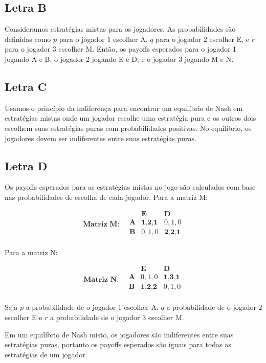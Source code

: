 \documentclass[12pt]{article}
\begin{document}
\subsection{\textbf{Letra B}}
Consideramos estratégias mistas para os jogadores. As probabilidades são definidas como \( p \) para o jogador 1 escolher A, \( q \) para o jogador 2 escolher E, e \( r \) para o jogador 3 escolher M. Então, os payoffs esperados para o jogador 1 jogando A e B, o jogador 2 jogando E e D, e o jogador 3 jogando M e N.

\subsection{\textbf{Letra C}}
Usamos o princípio da indiferença para encontrar um equilíbrio de Nash em estratégias mistas onde um jogador escolhe uma estratégia pura e os outros dois escolhem suas estratégias puras com probabilidades positivas. No equilíbrio, os jogadores devem ser indiferentes entre suas estratégias puras.

\subsection{\textbf{Letra D}}
Os payoffs esperados para as estratégias mistas no jogo são calculados com base nas probabilidades de escolha de cada jogador. Para a matriz M:

\[
\textbf{Matriz M:} \quad
\begin{array}{c|cc}
 & \textbf{E} & \textbf{D} \\
\hline
\textbf{A} & \textbf{1,2,1} & 0,1,0 \\
\textbf{B} & 0,1,0 & \textbf{2,2,1} \\
\end{array}
\]

Para a matriz N:

\[
\textbf{Matriz N:} \quad
\begin{array}{c|cc}
 & \textbf{E} & \textbf{D} \\
\hline
\textbf{A} & 0,1,0 & \textbf{1,3,1} \\
\textbf{B} & \textbf{1,2,2} & 0,1,0 \\
\end{array}
\]

Seja \( p \) a probabilidade de o jogador 1 escolher A, \( q \) a probabilidade de o jogador 2 escolher E e \( r \) a probabilidade de o jogador 3 escolher M. 

Em um equilíbrio de Nash misto, os jogadores são indiferentes entre suas estratégias puras, portanto os payoffs esperados são iguais para todas as estratégias de um jogador.
\end{document}
